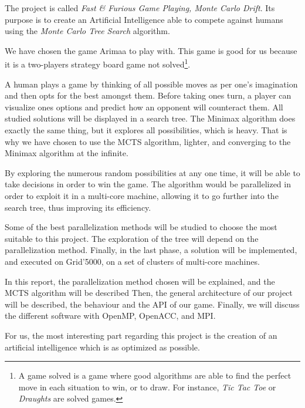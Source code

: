 The project is called \emph{Fast \& Furious Game Playing, Monte Carlo Drift}. Its purpose is to create an Artificial Intelligence able to compete against humans using the \emph{Monte Carlo Tree Search} algorithm.

We have chosen the game Arimaa to play with. This game is good for us because it is a two-players strategy board game not solved\footnote{A game solved is a game where good algorithms are able to find the perfect move in each situation to win, or to draw. For instance, \textit{Tic Tac Toe} or \textit{Draughts} are solved games.}.

A human plays a game by thinking of all possible moves as per one's imagination and then opts for the best amongst them. Before taking ones turn, a player can visualize ones options and predict how an opponent will counteract them. All studied solutions will be displayed in a search tree. The Minimax algorithm does exactly the same thing, but it explores all possibilities, which is heavy. That is why we have chosen to use the MCTS algorithm, lighter, and converging to the Minimax algorithm at the infinite.

By exploring the numerous random possibilities at any one time, it will be able to take decisions in order to win the game.
The algorithm would be parallelized in order to exploit it in a multi-core machine, allowing it to go further into the search tree, thus improving its efficiency.

Some of the best parallelization methods will be studied to choose the most suitable to this project.
The exploration of the tree will depend on the parallelization method.
Finally, in the last phase, a solution will be implemented, and executed on Grid'5000, on a set of clusters of multi-core machines.


In this report, the parallelization method chosen will be explained, and the MCTS algorithm will be described
Then, the general architecture of our project will be described, the behaviour and the API of our game.
Finally, we will discuss the different software with OpenMP, OpenACC, and MPI.

For us, the most interesting part regarding this project is the creation of an artificial intelligence which is as optimized as possible.